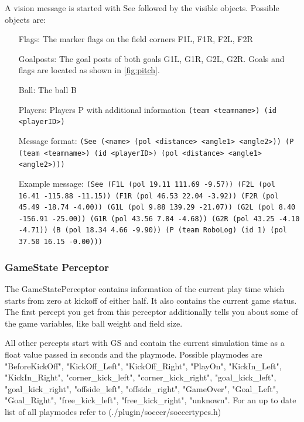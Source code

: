 A vision message is started with See followed by the visible objects.
Possible objects are:
\begin{itemize}
	\item[Flags:] The marker flags on the field corners F1L, F1R, F2L, F2R
	\item[Goalposts:] The goal posts of both goals G1L, G1R, G2L, G2R. Goals and
	flags are located as shown in \ref{fig:pitch}.
	\item[Ball:] The ball B 
	\item[Players:] Players P with additional information \texttt{(team <teamname>)
	(id <playerID>)}
\end{itemize}
\begin{itemize}
	\item[Message format:] \texttt{(See (<name> (pol <distance> <angle1>
	<angle2>)) (P (team <teamname>) (id <playerID>) (pol <distance> <angle1> <angle2>)))}
	\item[Example message:] \texttt{(See (F1L (pol 19.11 111.69 -9.57)) (F2L (pol 
	16.41 -115.88 -11.15)) (F1R (pol 46.53 22.04 -3.92)) (F2R (pol 45.49 -18.74
	-4.00)) (G1L (pol 9.88 139.29 -21.07)) (G2L (pol 8.40 -156.91 -25.00)) (G1R
	(pol 43.56 7.84 -4.68)) (G2R (pol 43.25 -4.10 -4.71)) (B (pol 18.34 4.66
	-9.90)) (P (team RoboLog) (id 1) (pol 37.50 16.15 -0.00)))}
\end{itemize}



\subsubsection{GameState Perceptor}
\label{sec:gamestateperceptor}

The GameStatePerceptor contains information of the current play time which
starts from zero at kickoff of either half. It also contains the current game status.
The first percept you get from this perceptor additionally tells you about some
of the game variables, like ball weight and field size.

All other percepts start with GS and contain the current simulation time as a
float value passed in seconds and the playmode. Possible
playmodes are "BeforeKickOff", "KickOff\_Left", "KickOff\_Right",
"PlayOn", "KickIn\_Left", "KickIn\_Right", "corner\_kick\_left",
"corner\_kick\_right", "goal\_kick\_left", "goal\_kick\_right",
"offside\_left", "offside\_right", "GameOver", "Goal\_Left",
"Goal\_Right", "free\_kick\_left", "free\_kick\_right", "unknown". For an
up to date list of all playmodes refer to (./plugin/soccer/soccertypes.h)

